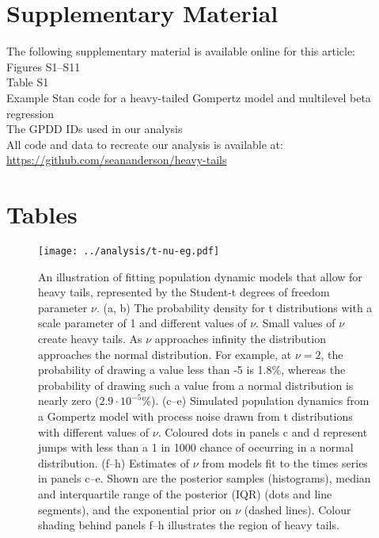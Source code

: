 \section{Supplementary Material}

The following supplementary material is available online for this article:\\
Figures S1--S11\\
Table S1\\
Example Stan code for a heavy-tailed Gompertz model and multilevel beta
regression\\
The GPDD IDs used in our analysis\\
All code and data to recreate our analysis is available at:\\
\url{https://github.com/seananderson/heavy-tails}




\clearpage

\section{Tables}



\begin{figure}[htbp]
\begin{center}
\texttt{[image: ../analysis/t-nu-eg.pdf]}
\caption{
An illustration of fitting population dynamic models that allow for heavy
tails, represented by the Student-t degrees of freedom parameter $\nu$. (a, b)
The probability density for t distributions with a scale parameter of 1 and
different values of $\nu$. Small values of $\nu$ create heavy tails. As $\nu$
approaches infinity the distribution approaches the normal distribution. For
example, at $\nu = 2$, the probability of drawing a value less than -5 is
1.8\%, whereas the probability of drawing such a value from a normal
distribution is nearly zero ($2.9\cdot10^{-5}$\%). (c--e) Simulated population
dynamics from a Gompertz model with process noise drawn from t distributions
with different values of $\nu$. Coloured dots in panels c and d represent jumps
with less than a 1 in 1000 chance of occurring in a normal distribution. (f--h)
Estimates of $\nu$ from models fit to the times series in panels c--e. Shown
are the posterior samples (histograms), median and interquartile range of the
posterior (IQR) (dots and line segments), and the exponential prior on $\nu$
(dashed lines). Colour shading behind panels f--h illustrates the region of
heavy tails.}
\label{fig:didactic}
\end{center}
\end{figure}

